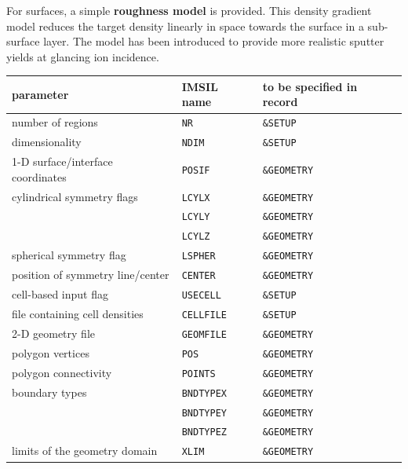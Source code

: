For surfaces, a simple \textbf{roughness model} is provided. 
This density gradient model \cite{lindsey_simple_2017} reduces the target 
density linearly in space towards the surface in a sub-surface layer. 
The model has been introduced to provide more realistic sputter yields at 
glancing ion incidence. 


\begin{center}
\begin{tabular}{lll}
parameter \quad                   & IMSIL name    & to be specified in record \\
\hline
number of regions                 & \texttt{NR}       & \texttt{\&SETUP} \\
dimensionality                    & \texttt{NDIM}     & \texttt{\&SETUP} \\
1-D surface/interface coordinates & \texttt{POSIF}    & \texttt{\&GEOMETRY} \\
cylindrical symmetry flags        & \texttt{LCYLX}    & \texttt{\&GEOMETRY} \\
                                  & \texttt{LCYLY}    & \texttt{\&GEOMETRY} \\
                                  & \texttt{LCYLZ}    & \texttt{\&GEOMETRY} \\
spherical symmetry flag           & \texttt{LSPHER}   & \texttt{\&GEOMETRY} \\
position of symmetry line/center  & \texttt{CENTER}   & \texttt{\&GEOMETRY} \\
cell-based input flag             & \texttt{USECELL}  & \texttt{\&SETUP} \\
file containing cell densities    & \texttt{CELLFILE} & \texttt{\&SETUP} \\
2-D geometry file                 & \texttt{GEOMFILE} & \texttt{\&GEOMETRY} \\
polygon vertices                  & \texttt{POS}      & \texttt{\&GEOMETRY} \\
polygon connectivity              & \texttt{POINTS}   & \texttt{\&GEOMETRY} \\
boundary types                    & \texttt{BNDTYPEX} & \texttt{\&GEOMETRY} \\
                                  & \texttt{BNDTYPEY} & \texttt{\&GEOMETRY} \\
                                  & \texttt{BNDTYPEZ} & \texttt{\&GEOMETRY} \\
limits of the geometry domain     & \texttt{XLIM}     & \texttt{\&GEOMETRY} \\

\end{tabular}
\end{center}

